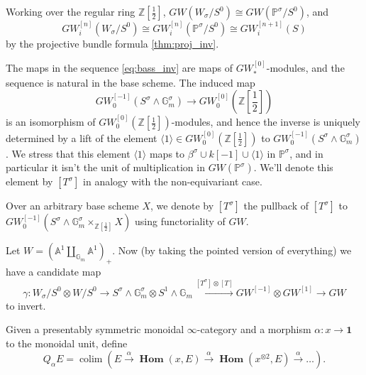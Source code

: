 \documentclass[edeposit,fullpage]{uiucthesis2009}
\newcommand{\Z}{\mathbb Z}
\newcommand{\mbb}{\mathbb}
\DeclareMathOperator*{\colim}{colim}
\DeclareMathOperator{\iHom}{\mathbf{Hom}}
\theoremstyle{plain}
\numberwithin{lemma}{section}
\theoremstyle{definition}
\begin{document}


Working over the regular ring $\Z[\frac{1}{2}]$, $GW(W_\sigma/S^0)
\cong GW(\mbb P^\sigma/S^0)$, and
\[  
GW^{[n]}_i(W_\sigma/S^0) \cong GW^{[n]}_i(\mbb P^\sigma/S^0) \cong GW^{[n+1]}_i(S)
\]
by the projective bundle formula \ref{thm:proj_inv}. 



The maps in the sequence
  \eqref{eq:bass_inv} are maps of $GW^{[0]}_*$-modules, and the
  sequence is natural in the base scheme. The induced map
\[
GW^{[-1]}_0(S^\sigma \wedge \mbb G_m^\sigma) \rightarrow GW^{[0]}_0(\Z[\frac{1}{2}])
\]
is an isomorphism of $GW^{[0]}_0(\Z[\frac{1}{2}])$-modules, and hence
the inverse is uniquely determined by a lift of the element $\langle 1 \rangle
\in GW^{[0]}_0(\Z[\frac{1}{2}])$ to $GW^{[-1]}_0(S^\sigma \wedge \mbb
G_m^\sigma)$. We stress that this element $\langle 1 \rangle$ maps to
$\beta^\sigma \cup k[-1] \cup \langle 1 \rangle$ in $\mbb P^\sigma$,
and in particular it isn't the unit of multiplication in $GW(\mbb P^\sigma)$. We'll denote this element by $[T^\sigma]$ in analogy with
the non-equivariant case. 

Over an arbitrary base scheme $X$, we denote by $[T^\sigma]$ the pullback of
$[T^\sigma]$ to $GW^{[-1]}_0(S^\sigma \wedge \mbb G_m^\sigma
\times_{\Z[\frac{1}{2}]} X)$ using functoriality of $GW$. 

Let $W = (\mbb A^1 \coprod_{\mbb G_m} \mbb A^1)_+$. Now (by taking the pointed version of everything) we have a candidate map
\begin{equation}\label{eq:gamma}
\gamma : W_\sigma/S^0 \otimes W/S^0 \rightarrow
S^\sigma \wedge \mbb G_m^\sigma \otimes S^1 \wedge \mbb G_m
\xrightarrow{[T^\sigma] \otimes [T]}
GW^{[-1]} \otimes GW^{[1]} \rightarrow GW
\end{equation}
to invert. 


Given a presentably symmetric monoidal $\infty$-category and a
morphism $\alpha : x \rightarrow \mathbf{1}$ to the monoidal unit,
define 
\[
Q_\alpha E = \colim(E \xrightarrow{\alpha} \iHom(x,E)
\xrightarrow{\alpha} \iHom(x^{\otimes 2}, E) \xrightarrow{\alpha}
\dots ).
\]
\end{document}
